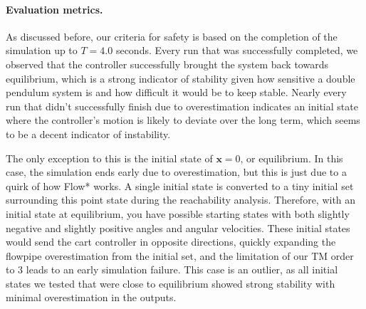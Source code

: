 \documentclass{article}
\theoremstyle{plain}
\theoremstyle{definition}
\theoremstyle{remark}
\begin{document}
\paragraph{Evaluation metrics.}
As discussed before, our criteria for safety is based on the completion of the simulation up to $T = 4.0$ seconds. Every run that was successfully completed, we observed that the controller successfully brought the system back towards equilibrium, which is a strong indicator of stability given how sensitive a double pendulum system is and how difficult it would be to keep stable. Nearly every run that didn’t successfully finish due to overestimation indicates an initial state where the controller’s motion is likely to deviate over the long term, which seems to be a decent indicator of instability.

The only exception to this is the initial state of $\textbf{x}=0$, or equilibrium. In this case, the simulation ends early due to overestimation, but this is just due to a quirk of how Flow* works. A single initial state is converted to a tiny initial set surrounding this point state during the reachability analysis. Therefore, with an initial state at equilibrium, you have possible starting states with both slightly negative and slightly positive angles and angular velocities. These initial states would send the cart controller in opposite directions, quickly expanding the flowpipe overestimation from the initial set, and the limitation of our TM order to 3 leads to an early simulation failure. This case is an outlier, as all initial states we tested that were close to equilibrium showed strong stability with minimal overestimation in the outputs.
\end{document}
